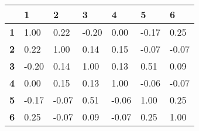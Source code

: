 \begin{tabular}{lllllll}

&\textbf{1}&\textbf{2}&\textbf{3}&\textbf{4}&\textbf{5}&\textbf{6}\\\hline
\textbf{1}&1.00&0.22&-0.20&0.00&-0.17&0.25\\
\textbf{2}&0.22&1.00&0.14&0.15&-0.07&-0.07\\
\textbf{3}&-0.20&0.14&1.00&0.13&0.51&0.09\\
\textbf{4}&0.00&0.15&0.13&1.00&-0.06&-0.07\\
\textbf{5}&-0.17&-0.07&0.51&-0.06&1.00&0.25\\
\textbf{6}&0.25&-0.07&0.09&-0.07&0.25&1.00\\
\end{tabular}
